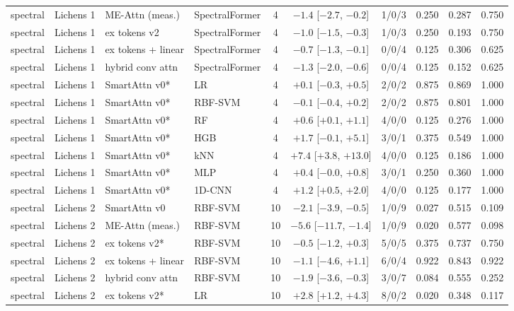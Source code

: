 \begin{tabular}{llllcclccc}
spectral & Lichens 1 & ME-Attn (meas.) & SpectralFormer & 4 & $-1.4$ [$-2.7$, $-0.2$] & 1/0/3 & 0.250 & 0.287 & 0.750 \\
spectral & Lichens 1 & ex tokens v2 & SpectralFormer & 4 & $-1.0$ [$-1.5$, $-0.3$] & 1/0/3 & 0.250 & 0.193 & 0.750 \\
spectral & Lichens 1 & ex tokens + linear & SpectralFormer & 4 & $-0.7$ [$-1.3$, $-0.1$] & 0/0/4 & 0.125 & 0.306 & 0.625 \\
spectral & Lichens 1 & hybrid conv attn & SpectralFormer & 4 & $-1.3$ [$-2.0$, $-0.6$] & 0/0/4 & 0.125 & 0.152 & 0.625 \\
spectral & Lichens 1 & SmartAttn v0* & LR & 4 & $+0.1$ [$-0.3$, $+0.5$] & 2/0/2 & 0.875 & 0.869 & 1.000 \\
spectral & Lichens 1 & SmartAttn v0* & RBF-SVM & 4 & $-0.1$ [$-0.4$, $+0.2$] & 2/0/2 & 0.875 & 0.801 & 1.000 \\
spectral & Lichens 1 & SmartAttn v0* & RF & 4 & $+0.6$ [$+0.1$, $+1.1$] & 4/0/0 & 0.125 & 0.276 & 1.000 \\
spectral & Lichens 1 & SmartAttn v0* & HGB & 4 & $+1.7$ [$-0.1$, $+5.1$] & 3/0/1 & 0.375 & 0.549 & 1.000 \\
spectral & Lichens 1 & SmartAttn v0* & kNN & 4 & $+7.4$ [$+3.8$, $+13.0$] & 4/0/0 & 0.125 & 0.186 & 1.000 \\
spectral & Lichens 1 & SmartAttn v0* & MLP & 4 & $+0.4$ [$-0.0$, $+0.8$] & 3/0/1 & 0.250 & 0.360 & 1.000 \\
spectral & Lichens 1 & SmartAttn v0* & 1D-CNN & 4 & $+1.2$ [$+0.5$, $+2.0$] & 4/0/0 & 0.125 & 0.177 & 1.000 \\
\midrule
spectral & Lichens 2 & SmartAttn v0 & RBF-SVM & 10 & $-2.1$ [$-3.9$, $-0.5$] & 1/0/9 & 0.027 & 0.515 & 0.109 \\
spectral & Lichens 2 & ME-Attn (meas.) & RBF-SVM & 10 & $-5.6$ [$-11.7$, $-1.4$] & 1/0/9 & 0.020 & 0.577 & 0.098 \\
spectral & Lichens 2 & ex tokens v2* & RBF-SVM & 10 & $-0.5$ [$-1.2$, $+0.3$] & 5/0/5 & 0.375 & 0.737 & 0.750 \\
spectral & Lichens 2 & ex tokens + linear & RBF-SVM & 10 & $-1.1$ [$-4.6$, $+1.1$] & 6/0/4 & 0.922 & 0.843 & 0.922 \\
spectral & Lichens 2 & hybrid conv attn & RBF-SVM & 10 & $-1.9$ [$-3.6$, $-0.3$] & 3/0/7 & 0.084 & 0.555 & 0.252 \\
spectral & Lichens 2 & ex tokens v2* & LR & 10 & $+2.8$ [$+1.2$, $+4.3$] & 8/0/2 & 0.020 & 0.348 & 0.117 \\

\end{tabular}

